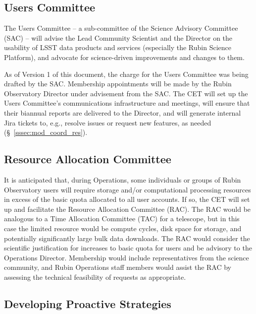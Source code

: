 \documentclass[DM,lsstdraft,toc]{lsstdoc}
\begin{document}
\subsection{Users Committee}\label{ssec:mod_uc}

The Users Committee -- a sub-committee of the Science Advisory Committee (SAC) -- will advise the Lead Community Scientist and the Director on the usability of LSST data products and services (especially the Rubin Science Platform), and advocate for science-driven improvements and changes to them.

As of Version 1 of this document, the charge for the Users Committee was being drafted by the SAC.
Membership appointments will be made by the Rubin Observatory Director under advisement from the SAC.
The CET will set up the Users Committee's communications infrastructure and meetings, will ensure that their biannual reports are delivered to the Director, and will generate internal Jira tickets to, e.g., resolve issues or request new features, as needed (\S~\ref{sssec:mod_coord_res}). 


\subsection{Resource Allocation Committee}\label{ssec:mod_rac}

It is anticipated that, during Operations, some individuals or groups of Rubin Observatory users will require storage and/or computational processing resources in excess of the basic quota allocated to all user accounts.
If so, the CET will set up and facilitate the Resource Allocation Committee (RAC).
The RAC would be analogous to a Time Allocation Committee (TAC) for a telescope, but in this case the limited resource would be compute cycles, disk space for storage, and potentially significantly large bulk data downloads.
The RAC would consider the scientific justification for increases to basic quota for users and be advisory to the Operations Director.
Membership would include representatives from the science community, and Rubin Operations staff members would assist the RAC by assessing the technical feasibility of requests as appropriate.


\subsection{Developing Proactive Strategies}
\end{document}
